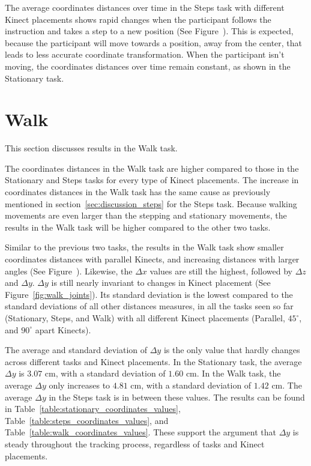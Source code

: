 The average coordinates distances over time in the Steps task with different Kinect placements shows rapid changes when the participant follows the instruction and takes a step to a new position (See Figure~). This is expected, because the participant will move towards a position, away from the center, that leads to less accurate coordinate transformation. When the participant isn't moving, the coordinates distances over time remain constant, as shown in the Stationary task.

\section{Walk}
\label{sec:discussion_walk}

This section discusses results in the Walk task.

The coordinates distances in the Walk task are higher compared to those in the Stationary and Steps tasks for every type of Kinect placements. The increase in coordinates distances in the Walk task has the same cause as previously mentioned in section~\ref{sec:discussion_steps} for the Steps task. Because walking movements are even larger than the stepping and stationary movements, the results in the Walk task will be higher compared to the other two tasks.

Similar to the previous two tasks, the results in the Walk task show smaller coordinates distances with parallel Kinects, and increasing distances with larger angles (See Figure~). Likewise, the $\Delta x$ values are still the highest, followed by $\Delta z$ and $\Delta y$. $\Delta y$ is still nearly invariant to changes in Kinect placement (See Figure~\ref{fig:walk_joints}). Its standard deviation is the lowest compared to the standard deviations of all other distances measures, in all the tasks seen so far (Stationary, Steps, and Walk) with all different Kinect placements (Parallel, $45^{\circ}$, and $90^{\circ}$ apart Kinects).

The average and standard deviation of $\Delta y$ is the only value that hardly changes across different tasks and Kinect placements. In the Stationary task, the average $\Delta y$ is $3.07$ cm, with a standard deviation of $1.60$ cm. In the Walk task, the average $\Delta y$ only increases to $4.81$ cm, with a standard deviation of $1.42$ cm. The average $\Delta y$ in the Steps task is in between these values. The results can be found in Table~\ref{table:stationary_coordinates_values}, Table~\ref{table:steps_coordinates_values}, and Table~\ref{table:walk_coordinates_values}. These support the argument that $\Delta y$ is steady throughout the tracking process, regardless of tasks and Kinect placements.

